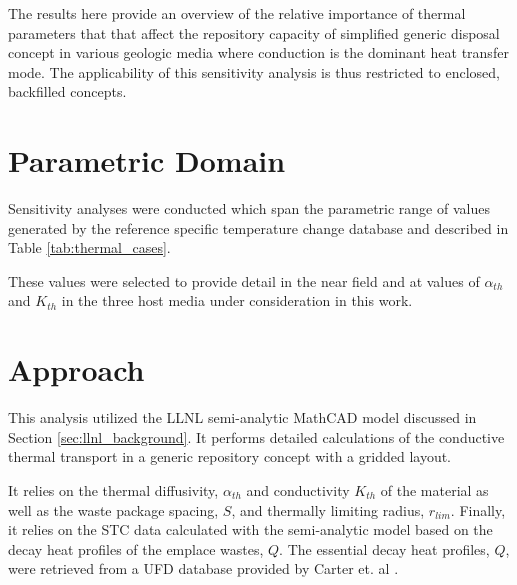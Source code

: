 
The results here provide an overview of the relative importance of thermal
parameters that that affect the repository capacity of simplified generic
disposal concept in various geologic media where conduction is the dominant
heat transfer mode. The applicability of this sensitivity analysis is thus
restricted to enclosed, backfilled concepts.  

\section{Parametric Domain}

Sensitivity analyses were conducted which span the parametric range of values 
generated by the reference specific temperature change database and described 
in Table \ref{tab:thermal_cases}.  



These values were selected to provide detail in the near field and at values of
$\alpha_{th}$ and $K_{th}$ in the three host media under consideration in this
work.

\section{Approach}

This analysis utilized the \gls{LLNL} semi-analytic MathCAD model
discussed in Section \ref{sec:llnl_background}.  It performs detailed
calculations of the conductive thermal transport in a generic repository
concept with a gridded layout.  

It relies on the thermal diffusivity, $\alpha_{th}$ and conductivity $K_{th}$ of 
the material as well as the waste package spacing, $S$, and thermally limiting 
radius, $r_{lim}$. Finally, it relies on the \gls{STC} data calculated with the 
semi-analytic model based on the decay heat profiles of the emplace wastes, $Q$. 
The essential decay heat profiles, $Q$, were retrieved from a \gls{UFD} database 
provided by Carter et. al \cite{carter_fuel_2011}.


